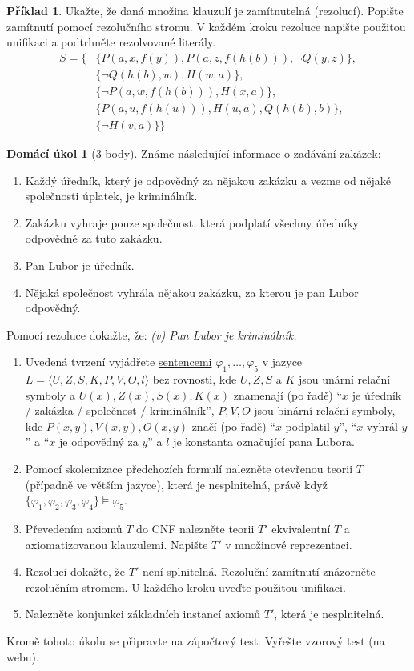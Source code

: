 \documentclass[a4paper]{article}
\theoremstyle{definition}
\newtheorem{problem}{Příklad}
\newtheorem*{ukol}{Domácí úkol}
\begin{document}
\medskip\begin{problem}
    Ukažte, že daná množina klauzulí je zamítnutelná (rezolucí). Popište zamítnutí pomocí rezolučního stromu. V každém kroku rezoluce napište použitou unifikaci a podtrhněte rezolvované literály.
    \begin{align*}
        S=\{
            &\{P(a,x,f(y)),P(a,z,f(h(b))),\neg Q(y,z)\},\\
            &\{\neg Q(h(b),w),H(w,a)\},\\
            &\{\neg P(a,w,f(h(b))),H(x,a)\},\\
            &\{P(a,u,f(h(u))),H(u,a),Q(h(b),b)\},\\
            &\{\neg H(v,a)\}
        \}
    \end{align*}
\end{problem}


\medskip\begin{ukol}[3 body]
Známe následující informace o zadávání zakázek:
\begin{enumerate}[label=(\roman*)] \it
    \item Každý úředník, který je odpovědný za nějakou zakázku a vezme od nějaké společnosti úplatek, je kriminálník.
    \item Zakázku vyhraje pouze společnost, která podplatí všechny úředníky odpovědné za tuto zakázku.
    \item Pan Lubor je úředník.
    \item Nějaká společnost vyhrála nějakou zakázku, za kterou je pan Lubor odpovědný.
\end{enumerate}
Pomocí rezoluce dokažte, že: {\it (v) Pan Lubor je kriminálník.}
\begin{enumerate}
    \item Uvedená tvrzení vyjádřete \underline{sentencemi} $\varphi_1, \dots, \varphi_5$ v jazyce $L=\langle U, Z, S, K, P, V, O, l \rangle$ bez rovnosti, kde $U, Z, S$ a $K$ jsou unární relační symboly a $U(x), Z(x), S(x), K(x)$ znamenají (po řadě) ``$x$ je úředník / zakázka / společnost / kriminálník'', $P, V, O$ jsou binární relační symboly, kde $P(x,y), V(x,y), O(x,y)$ značí (po řadě) ``$x$ podplatil $y$'', ``$x$ vyhrál $y$'' a ``$x$ je odpovědný za $y$'' a $l$ je konstanta označující pana Lubora.
    \item Pomocí skolemizace předchozích formulí nalezněte otevřenou teorii $T$ (případně ve větším jazyce), která je nesplnitelná, právě když  $\{\varphi_1, \varphi_2, \varphi_3, \varphi_4\} \models \varphi_5$.
    \item Převedením axiomů $T$ do CNF nalezněte teorii $T'$ ekvivalentní $T$ a axiomatizovanou klauzulemi. Napište $T'$ v množinové reprezentaci.
    \item Rezolucí dokažte, že $T'$ není splnitelná. Rezoluční zamítnutí znázorněte rezolučním stromem. U každého kroku uveďte použitou unifikaci.
    \item Nalezněte konjunkci základních instancí axiomů $T'$, která je nesplnitelná.
    \end{enumerate}



Kromě tohoto úkolu se připravte na zápočtový test. Vyřešte vzorový test (na webu).
\end{ukol}
\end{document}
